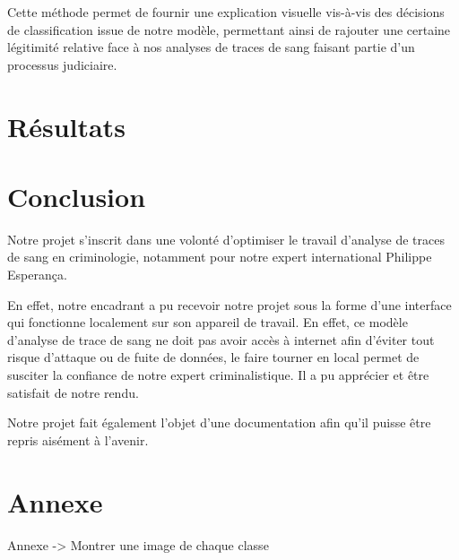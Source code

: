 \documentclass[a4paper]{llncs}
\begin{document}
Cette méthode permet de fournir une explication visuelle vis-à-vis des décisions de classification issue de notre modèle, permettant ainsi de rajouter une certaine légitimité relative face à nos analyses de traces de sang faisant partie d'un processus judiciaire. 

\section{Résultats}


\section{Conclusion}

Notre projet s'inscrit dans une volonté d'optimiser le travail d'analyse de traces de sang en criminologie, notamment pour notre expert international Philippe Esperança. 

En effet, notre encadrant a pu recevoir notre projet sous la forme d'une interface qui fonctionne localement sur son appareil de travail. En effet, ce modèle d'analyse de trace de sang ne doit pas avoir accès à internet afin d'éviter tout risque d'attaque ou de fuite de données, le faire tourner en local permet de susciter la confiance de notre expert criminalistique. Il a pu apprécier et être satisfait de notre rendu.

Notre projet fait également l'objet d'une documentation afin qu'il puisse être repris aisément à l'avenir. 


\section{Annexe}

Annexe -> Montrer une image de chaque classe 

\end{document}
